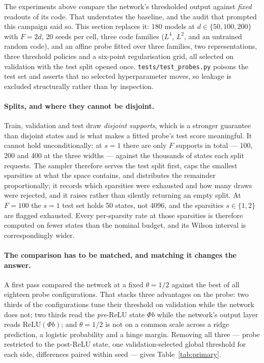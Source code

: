 \documentclass[preprint,12pt]{elsarticle}
\theoremstyle{definition}
\newcommand{\code}[1]{\texttt{\small #1}}
\begin{document}
The experiments above compare the network's thresholded output against \emph{fixed} readouts of its
code. That understates the baseline, and the audit that prompted this campaign said so. This section
replaces it: 180 models at $d\in\{50,100,200\}$ with $F=2d$, 20 seeds per cell, three code families
($L^4$, $L^2$, and an untrained random code), and an affine probe fitted over three families, two
representations, three threshold policies and a six-point regularisation grid, all selected on
validation with the test split opened once. \code{tests/test\_probes.py} poisons the test set and
asserts that no selected hyperparameter moves, so leakage is excluded structurally rather than by
inspection.

\paragraph{Splits, and where they cannot be disjoint.} Train, validation and test draw
\emph{disjoint supports}, which is a stronger guarantee than disjoint states and is what makes a
fitted probe's test score meaningful. It cannot hold unconditionally: at $s=1$ there are only $F$
supports in total --- 100, 200 and 400 at the three widths --- against the thousands of states each
split requests. The sampler therefore serves the test split first, caps the smallest sparsities at
what the space contains, and distributes the remainder proportionally; it records which sparsities
were exhausted and how many draws were rejected, and it raises rather than silently returning an
empty split. At $F=100$ the $s=1$ test set holds 50 states, not 4096, and the sparsities $s\in\{1,2\}$
are flagged exhausted. Every per-sparsity rate at those sparsities is therefore computed on fewer
states than the nominal budget, and its Wilson interval is correspondingly wider.

\paragraph{The comparison has to be matched, and matching it changes the answer.}
A first pass compared the network at a fixed $\theta=1/2$ against the best of all eighteen probe
configurations. That stacks three advantages on the probe: two thirds of the configurations tune
their threshold on validation while the network does not; two thirds read the \emph{pre}-ReLU state
$\Phi b$ while the network's output layer reads $\mathrm{ReLU}(\Phi b)$; and $\theta=1/2$ is not on a
common scale across a ridge prediction, a logistic probability and a hinge margin. Removing all
three --- probe restricted to the post-ReLU state, one validation-selected global threshold for each
side, differences paired within seed --- gives Table~\ref{tab:primary}.
\end{document}
